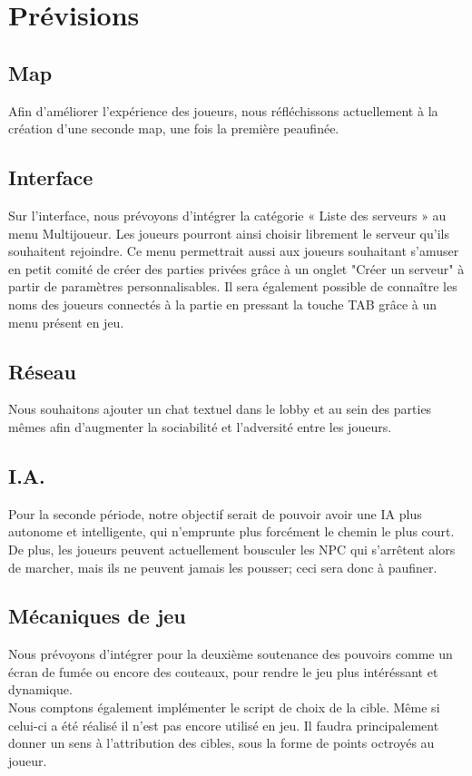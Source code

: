 \section{Prévisions}

\subsection{Map}
    Afin d'améliorer l'expérience des joueurs, nous réfléchissons actuellement à la création d'une 
    seconde map, une fois la première peaufinée.
\subsection{Interface}
    Sur l’interface, nous prévoyons d’intégrer la catégorie « Liste des serveurs » au menu Multijoueur. 
    Les joueurs pourront ainsi choisir librement le serveur qu’ils souhaitent rejoindre. 
    Ce menu permettrait aussi aux joueurs souhaitant s'amuser en petit comité de créer des 
    parties privées grâce à un onglet "Créer un serveur" à partir de paramètres personnalisables. 
    Il sera également possible de connaître les noms des joueurs connectés à la partie en pressant 
    la touche TAB grâce à un menu présent en jeu.

\subsection{Réseau}
    Nous souhaitons ajouter un chat textuel dans le lobby et au sein des parties mêmes afin d’augmenter la sociabilité et l’adversité entre les joueurs.

\subsection{I.A.}
    Pour la seconde période, notre objectif serait de pouvoir avoir une IA plus autonome et intelligente, qui n'emprunte plus forcément le chemin le plus court. 
    De plus, les joueurs peuvent actuellement bousculer les NPC qui s'arrêtent alors de marcher, mais ils ne peuvent jamais les pousser; 
    ceci sera donc à paufiner.

\subsection{Mécaniques de jeu}
    Nous prévoyons d'intégrer pour la deuxième soutenance des pouvoirs
    comme un écran de fumée ou encore des couteaux,
    pour rendre le jeu plus intéréssant et dynamique.\\
    Nous comptons également implémenter le script de choix de la cible.
    Même si celui-ci a été réalisé il n'est pas encore utilisé en jeu.
    Il faudra principalement donner un sens à l'attribution des cibles,
    sous la forme de points octroyés au joueur.


